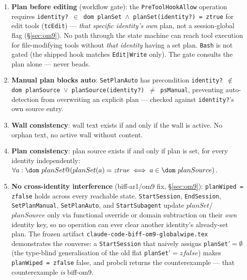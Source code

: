 \documentclass[a4paper,10pt,fleqn]{article}
\begin{document}
\begin{enumerate}
  \item \textbf{Plan before editing} (workflow gate): the
    \texttt{PreToolHookAllow} operation requires
    \texttt{identity? $\in$ dom planSet $\land$ planSet(identity?) =
    ztrue} for edit tools (\texttt{tcEdit}) --- \emph{that specific
    identity's own} plan, not a session-global flag
    (\S\ref{sec:om9}). No path through the state machine can reach
    tool execution for file-modifying tools without \emph{that
    identity} having a set plan. \texttt{Bash} is not gated (the
    shipped hook matches \texttt{Edit|Write} only). The gate consults
    the plan alone --- never beads.

  \item \textbf{Manual plan blocks auto}: \texttt{SetPlanAuto} has
    precondition \texttt{identity? $\notin$ dom planSource $\lor$
    planSource(identity?) $\neq$ psManual}, preventing auto-detection
    from overwriting an explicit plan --- checked against
    \texttt{identity?}'s own source entry.

  \item \textbf{Wall consistency}: wall text exists if and only if
    the wall is active. No orphan text, no active wall without content.

  \item \textbf{Plan consistency}: plan source exists if and only if
    plan is set, for every identity independently:
    \texttt{$\forall a : \dom\ planSet @ ( planSet(a) = ztrue
    \iff a \in \dom\ planSource )$}.

  \item \textbf{No cross-identity interference} (biff-ar1/om9 fix,
    \S\ref{sec:om9}): \texttt{planWiped = zfalse} holds across every
    reachable state. \texttt{StartSession}, \texttt{EndSession},
    \texttt{SetPlanManual}, \texttt{SetPlanAuto}, and
    \texttt{StartSubagent} update $planSet$/$planSource$ only via
    functional override or domain subtraction on their \emph{own}
    identity key, so no operation can ever clear another identity's
    already-set plan. The frozen artifact
    \texttt{claude-code-biff-om9-globalwipe.tex} demonstrates the
    converse: a \texttt{StartSession} that naively assigns
    \texttt{planSet}${}'{} = \emptyset$ (the type-blind generalisation
    of the old flat \texttt{planSet}${}'{} = zfalse$) makes
    \texttt{planWiped = zfalse} false, and probcli returns the
    counterexample --- that counterexample \emph{is} biff-om9.


\end{enumerate}
\end{document}
